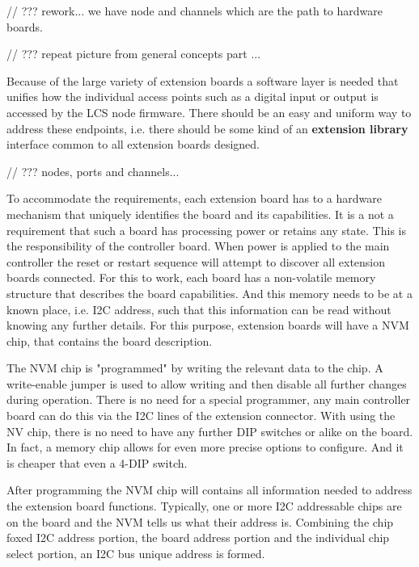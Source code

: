
// ??? rework... we have node and channels which are the path to hardware boards.




// ??? repeat picture from general concepts part ...



Because of the large variety of extension boards a software layer is needed that unifies how the individual access points such as a digital input or output is accessed by the LCS node firmware. There should be an easy and uniform way to address these endpoints, i.e. there should be some kind of an \textbf{extension library} interface common to all extension boards designed.



// ??? nodes, ports and channels...

To accommodate the requirements, each extension board has to a hardware mechanism that uniquely identifies the board and its capabilities. It is a not a requirement that such a board has processing power or retains any state. This is the responsibility of the controller board. When power is applied to the main controller the reset or restart sequence will attempt to discover all extension boards connected. For this to work, each board has a non-volatile memory structure that describes the board capabilities. And this memory needs to be at a known place, i.e. I2C address, such that this information can be read without knowing any further details. For this purpose, extension boards will have a NVM chip, that contains the board description.

The NVM chip is "programmed" by writing the relevant data to the chip. A write-enable jumper is used to allow writing and then disable all further changes during operation. There is no need for a special programmer, any main controller board can do this via the I2C lines of the extension connector. With using the NV chip, there is no need to have any further DIP switches or alike on the board. In fact, a memory chip allows for even more precise options to configure. And it is cheaper that even a 4-DIP switch.

After programming the NVM chip will contains all information needed to address the extension board functions. Typically, one or more I2C addressable chips are on the board and the NVM tells us what their address is. Combining the chip foxed I2C address portion, the board address portion and the individual chip select portion, an I2C bus unique address is formed. 

